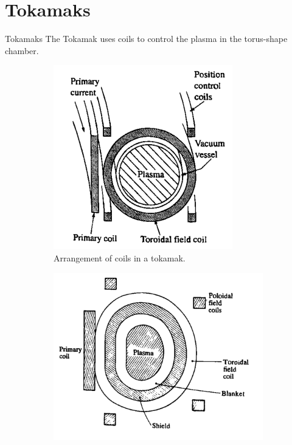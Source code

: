 \section{Tokamaks}
\begin{frame}{Tokamaks}
    The Tokamak uses coils to control the plasma in the torus-shape chamber.
    \begin{figure}
        \begin{subfigure}{0.5\textwidth}
            \centering
            \includegraphics[width=\textwidth]{figures/tokamak-coils.png}
            \caption{Arrangement of coils in a tokamak.}
        \end{subfigure}%
        \begin{subfigure}{0.5\textwidth}
            \centering
            \includegraphics[width=\textwidth]{figures/tokamak-coils-layout.png}

\end{subfigure}
\end{figure}
\end{frame}
